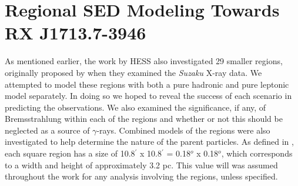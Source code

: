 \documentclass[12pt,a4paper]{article}
\begin{document}
\newpage
\section{Regional SED Modeling Towards RX J1713.7-3946} \label{sec:regseds}
As mentioned earlier, the work by HESS also investigated 29 smaller regions, originally proposed by \cite{2008ApJ...685..988T} when they examined the \textit{Suzaku} X-ray data. We attempted to model these regions with both a pure hadronic and pure leptonic model separately. In doing so we hoped to reveal the success of each scenario in predicting the observations. We also examined the significance, if any, of Bremsstrahlung within each of the regions and whether or not this should be neglected as a source of $\gamma$-rays. Combined models of the regions were also investigated to help determine the nature of the parent particles. As defined in \cite{2008ApJ...685..988T}, each square region has a size of 10.8$^\prime$ x 10.8$^\prime$ = 0.18$^o$ x 0.18$^o$, which corresponds to a width and height of approximately 3.2 pc. This value will was assumed throughout the work for any analysis involving the regions, unless specified.
\end{document}
